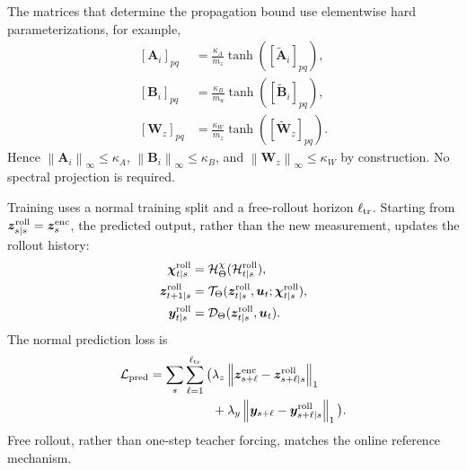 \documentclass[journal]{IEEEtran}
\newcommand{\norm}[1]{\left\lVert #1\right\rVert}
\newcommand{\1}{\bm 1}
\begin{document}
The matrices that determine the propagation bound use elementwise hard
parameterizations, for example,
\begin{equation}
\begin{aligned}
[\bm A_i]_{pq}&=\frac{\kappa_A}{m_z}
\tanh([\widetilde{\bm A}_i]_{pq}),\\
[\bm B_i]_{pq}&=\frac{\kappa_B}{m_u}
\tanh([\widetilde{\bm B}_i]_{pq}),\\
[\bm W_z]_{pq}&=\frac{\kappa_W}{m_z}
\tanh([\widetilde{\bm W}_z]_{pq}).
\end{aligned}
\label{eq:hard_bounds}
\end{equation}
Hence $\norm{\bm A_i}_\infty\leq\kappa_A$,
$\norm{\bm B_i}_\infty\leq\kappa_B$, and
$\norm{\bm W_z}_\infty\leq\kappa_W$ by construction. No spectral projection
is required.

Training uses a normal training split and a free-rollout horizon
$\ell_{\rm tr}$. Starting from $\bm z_{s\mid s}^{\rm roll}=\bm z_s^{\rm enc}$,
the predicted output, rather than the new measurement, updates the rollout
history:
\begin{equation}
\begin{aligned}
\bm\chi_{t\mid s}^{\rm roll}
&=\mathcal H_\Theta^\chi(\mathcal H_{t\mid s}^{\rm roll}),\\
\bm z_{t+1\mid s}^{\rm roll}
&=\mathcal T_\Theta(\bm z_{t\mid s}^{\rm roll},\bm u_t;
\bm\chi_{t\mid s}^{\rm roll}),\\
\bm y_{t\mid s}^{\rm roll}
&=\mathcal D_\Theta(\bm z_{t\mid s}^{\rm roll},\bm u_t).
\end{aligned}
\label{eq:free_rollout}
\end{equation}
The normal prediction loss is
\begin{equation}
\begin{aligned}
\mathcal L_{\rm pred}
=\sum_s\sum_{\ell=1}^{\ell_{\rm tr}}\big(&
\lambda_z\norm{\bm z_{s+\ell}^{\rm enc}
-\bm z_{s+\ell\mid s}^{\rm roll}}_1\\
&+
\lambda_y\norm{\bm y_{s+\ell}
-\bm y_{s+\ell\mid s}^{\rm roll}}_1
\big).
\end{aligned}
\label{eq:prediction_loss}
\end{equation}
Free rollout, rather than one-step teacher forcing, matches the online
reference mechanism.
\end{document}
